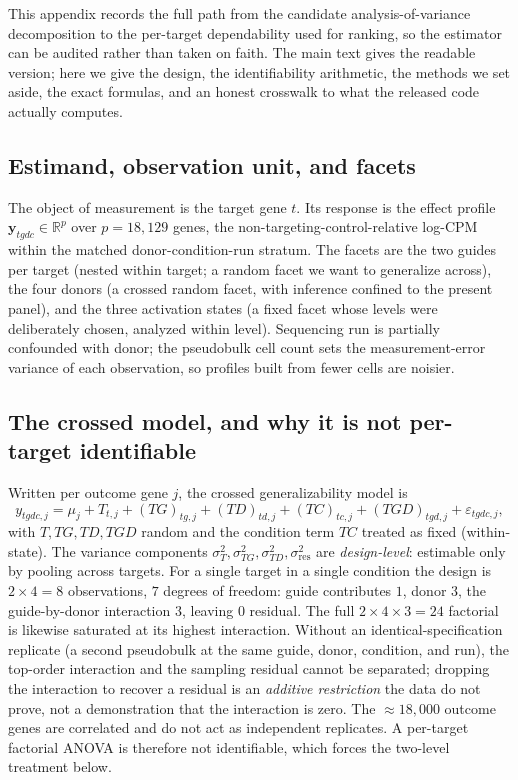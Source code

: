 \documentclass[11pt]{article}
\begin{document}
This appendix records the full path from the candidate analysis-of-variance
decomposition to the per-target dependability used for ranking, so the estimator
can be audited rather than taken on faith. The main text gives the readable
version; here we give the design, the identifiability arithmetic, the methods we
set aside, the exact formulas, and an honest crosswalk to what the released code
actually computes.

\subsection{Estimand, observation unit, and facets}

The object of measurement is the target gene $t$. Its response is the effect
profile $\mathbf{y}_{tgdc}\in\mathbb{R}^{p}$ over $p=18{,}129$ genes, the
non-targeting-control-relative log-CPM within the matched donor-condition-run
stratum. The facets are the two guides per target (nested within target; a random
facet we want to generalize across), the four donors (a crossed random facet, with
inference confined to the present panel), and the three activation states (a fixed
facet whose levels were deliberately chosen, analyzed within level). Sequencing run is
partially confounded with donor; the pseudobulk cell count sets the
measurement-error variance of each observation, so profiles built from fewer cells
are noisier.

\subsection{The crossed model, and why it is not per-target identifiable}

Written per outcome gene $j$, the crossed generalizability model is
\[
y_{tgdc,j} = \mu_j + T_{t,j} + (TG)_{tg,j} + (TD)_{td,j} + (TC)_{tc,j}
             + (TGD)_{tgd,j} + \varepsilon_{tgdc,j},
\]
with $T,TG,TD,TGD$ random and the condition term $TC$ treated as fixed
(within-state). The variance components $\sigma^2_T,\sigma^2_{TG},\sigma^2_{TD},
\sigma^2_{\mathrm{res}}$ are \emph{design-level}: estimable only by pooling across
targets. For a single target in a single condition the design is $2\times4=8$
observations, $7$ degrees of freedom: guide contributes $1$, donor $3$, the
guide-by-donor interaction $3$, leaving $0$ residual. The full $2\times4\times3=24$
factorial is likewise saturated at its highest interaction. Without an
identical-specification replicate (a second pseudobulk at the same guide, donor,
condition, and run), the top-order interaction and the sampling residual cannot be
separated; dropping the interaction to recover a residual is an \emph{additive
restriction} the data do not prove, not a demonstration that the interaction is
zero. The $\approx 18{,}000$ outcome genes are correlated and do not act as
independent replicates. A per-target factorial ANOVA is therefore not identifiable,
which forces the two-level treatment below.
\end{document}
